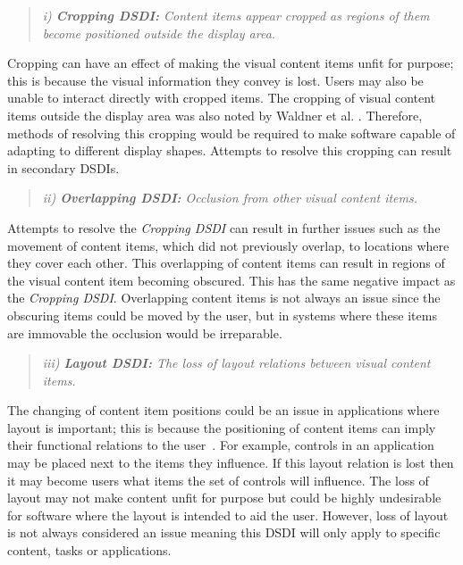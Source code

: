 \documentclass[twocolumn,compsoc]{cvm}
\begin{document}
\begin{quote}\emph{i) \textbf{Cropping \ac{DSDI}:} Content items appear cropped as regions of them become positioned outside the display area.}\end{quote}

Cropping can have an effect of making the visual content items unfit for purpose; this is because the visual information they convey is lost.
Users may also be unable to interact directly with cropped items.
The cropping of visual content items outside the display area was also noted by Waldner et al. \cite{Waldner2011}.
Therefore, methods of resolving this cropping would be required to make software capable of adapting to different display shapes.
Attempts to resolve this cropping can result in secondary \acp{DSDI}.

\begin{quote}\emph{ii) \textbf{Overlapping \ac{DSDI}:} Occlusion from other visual content items.}\end{quote}

Attempts to resolve the {\emph{Cropping \ac{DSDI}}} can result in further issues such as the movement of content items, which did not previously overlap, to locations where they cover each other.
This overlapping of content items can result in regions of the visual content item becoming obscured.
This has the same negative impact as the {\emph{Cropping \ac{DSDI}}}.
Overlapping content items is not always an issue since the obscuring items could be moved by the user, but in systems where these items are immovable the occlusion would be irreparable.

\begin{quote}\emph{iii) \textbf{Layout \ac{DSDI}:} The loss of layout relations between visual content items.}\end{quote}

The changing of content item positions could be an issue in applications where layout is important; this is because the positioning of content items can imply their functional relations to the user~\cite{Constantine1999,mcnaughton-et-al:hcis2017}.
For example, controls in an application may be placed next to the items they influence.
If this layout relation is lost then it may become users what items the set of controls will influence. 
The loss of layout may not make content unfit for purpose but could be highly undesirable for software where the layout is intended to aid the user.
However, loss of layout is not always considered an issue meaning this \ac{DSDI} will only apply to specific content, tasks or applications.
\end{document}

